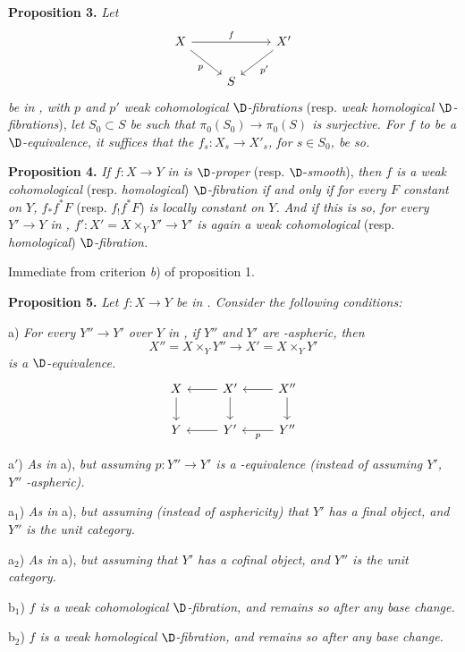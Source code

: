 
\textbf{Proposition 3.} \textit{Let}
\[
\begin{tikzcd}
X \arrow[rr, "f"] \arrow[dr, "p"'] & & X' \arrow[dl, "p'"] \\
& S &
\end{tikzcd}
\]
\textit{be in \Dia, with $p$ and $p'$ weak cohomological $\D$-fibrations} (resp. \textit{weak homological $\D$-fibrations}), \textit{let $S_0 \subset S$ be such that $\pi_0(S_0) \to \pi_0(S)$ is surjective. For $f$ to be a $\D$-equivalence, it suffices that the $f_s : X_s \to X'_s$, for $s \in S_0$, be so.}

\textbf{Proposition 4.} \textit{If $f : X \to Y$ in \Dia{} is $\D$-proper} (resp. $\D$-\textit{smooth}), \textit{then $f$ is a weak cohomological} (resp. \textit{homological}) \textit{$\D$-fibration if and only if for every $F$ constant on $Y$, $f_*f^*F$} (resp. $f_!f^*F$) \textit{is locally constant on $Y$. And if this is so, for every $Y' \to Y$ in \Dia, $f' : X' = X \times_Y Y' \to Y'$ is again a weak cohomological} (resp. \textit{homological}) \textit{$\D$-fibration.}

Immediate from criterion \textit{b}) of proposition 1.

\textbf{Proposition 5.} \textit{Let $f : X \to Y$ be in \Dia. Consider the following conditions:}

a) \textit{For every $Y'' \to Y'$ over $Y$ in \Dia, if $Y''$ and $Y'$ are \Hot-aspheric, then}
\[
X'' = X \times_Y Y'' \longrightarrow X' = X \times_Y Y'
\]
\textit{is a $\D$-equivalence.}
\[
\begin{tikzcd}
X & X' \arrow[l] & X'' \arrow[l] \\
Y \arrow[from=u] & Y' \arrow[l] \arrow[from=u] & Y'' \arrow[l, "p"] \arrow[from=u]
\end{tikzcd}
\]

a$'$) \textit{As in} a), \textit{but assuming $p : Y'' \to Y'$ is a \Hot-equivalence (instead of assuming $Y'$, $Y''$ \Hot-aspheric).}

a$_1$) \textit{As in} a), \textit{but assuming (instead of asphericity) that $Y'$ has a final object, and $Y''$ is the unit category.}

a$_2$) \textit{As in} a), \textit{but assuming that $Y'$ has a cofinal object, and $Y''$ is the unit category.}

b$_1$) \textit{$f$ is a weak cohomological $\D$-fibration, and remains so after any base change.}

b$_2$) \textit{$f$ is a weak homological $\D$-fibration, and remains so after any base change.}

